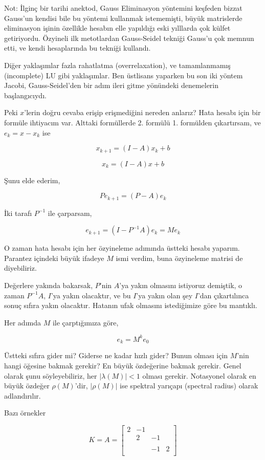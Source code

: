 \documentclass[12pt,fleqn]{article}\usepackage{../../common}
\begin{document}
Not: İlginç bir tarihi anektod, Gauss Eliminasyon yöntemini keşfeden bizzat
Gauss'un kendisi bile bu yöntemi kullanmak istememişti, büyük matrislerde
eliminasyon işinin özellikle hesabın elle yapıldığı eski yılllarda çok
külfet getiriyordu. Özyineli ilk metotlardan Gauss-Seidel tekniği Gauss'u
çok memnun etti, ve kendi hesaplarında bu tekniği kullandı.

Diğer yaklaşımlar fazla rahatlatma (overrelaxation), ve tamamlanmamış
(incomplete) LU gibi yaklaşımlar. Ben üstlisans yaparken bu son iki yöntem
Jacobi, Gauss-Seidel'den bir adım ileri gitme yönündeki denemelerin
başlangıcıydı. 

Peki $x$'lerin doğru cevaba erişip erişmediğini nereden anlarız? Hata
hesabı için bir formüle ihtiyacım var. Alttaki formüllerde 2. formülü
1. formülden çıkartırsam, ve $e_k = x - x_k$ ise

$$ x_{k+1} = (I - A)x_k + b $$

$$ x_k = (I - A)x + b $$

Şunu elde ederim,

$$ Pe_{k+1} = (P-A)e_k $$

İki tarafı $P^{-1}$ ile çarparsam,

$$ e_{k+1} = (I-P^{-1}A)e_k = Me_k$$

O zaman hata hesabı için her özyineleme adımında üstteki hesabı
yaparım. Parantez içindeki büyük ifadeye $M$ ismi verdim, buna özyineleme
matrisi de diyebiliriz. 

Değerlere yakında bakarsak, $P$'nin $A$'ya yakın olmasını istiyoruz
demiştik, o zaman $P^{-1}A$, $I$'ya yakın olacaktır, ve bu $I$'ya yakın
olan şey $I$'dan çıkartılınca sonuç sıfıra yakın olacaktır. Hatanın ufak
olmasını istediğimize göre bu mantıklı. 

Her adımda $M$ ile çarptığımıza göre, 

$$ e_k = M^k e_0 $$

Üstteki sıfıra gider mi? Giderse ne kadar hızlı gider? Bunun olması için
$M$'nin hangi öğesine bakmak gerekir? En büyük özdeğerine bakmak
gerekir. Genel olarak şunu söyleyebiliriz, her $|\lambda(M)| < 1$ olması
gerekir. Notasyonel olarak en büyük özdeğer $\rho(M)$'dir, $|\rho(M)|$ ise
spektral yarıçapı (spectral radius) olarak adlandırılır.

Bazı örnekler

$$ K = A = 
\left[\begin{array}{rrrr}
2 & -1 && \\
& 2 & -1 & \\
&&& \\
&& -1 & 2 \\
\end{array}\right]
 $$
\end{document}
